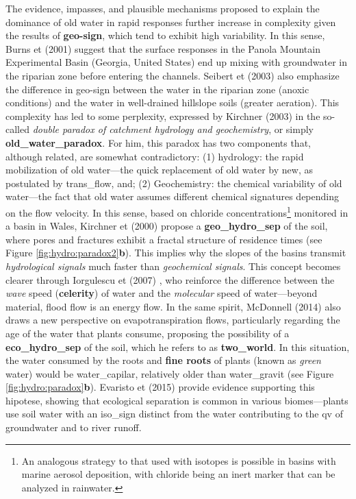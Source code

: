 \documentclass[./main_en.tex]{subfiles}
\begin{document}
\par The evidence, impasses, and plausible mechanisms proposed to explain the dominance of old water in rapid responses further increase in complexity given the results of \textbf{\gls{geo-sign}}, which tend to exhibit high variability. In this sense, Burns et  (2001) \cite{burns2001quantifying} suggest that the surface responses in the Panola Mountain Experimental Basin (Georgia, United States) end up mixing with groundwater in the riparian zone before entering the channels. Seibert et  (2003) \cite{seibert2003groundwater} also emphasize the difference in \gls{geo-sign} between the water in the riparian zone (anoxic conditions) and the water in well-drained hillslope soils (greater aeration). This complexity has led to some perplexity, expressed by Kirchner (2003) \cite{Kirchner2003} in the so-called \textit{double paradox of catchment hydrology and geochemistry}, or simply \textbf{\gls{old_water_paradox}}. For him, this paradox has two components that, although related, are somewhat contradictory: (1) \gls{hydrology}: the rapid mobilization of old water—the quick replacement of old water by new, as postulated by \gls{trans_flow}, and; (2) Geochemistry: the chemical variability of old water—the fact that old water assumes different chemical signatures depending on the flow velocity. In this sense, based on chloride concentrations\footnote{An analogous strategy to that used with isotopes is possible in basins with marine aerosol deposition, with chloride being an inert marker that can be analyzed in rainwater.} monitored in a basin in Wales, Kirchner et  (2000) \cite{kirchner2000} propose a \textbf{\gls{geo_hydro_sep}} of the soil, where pores and fractures exhibit a fractal structure of residence times (see Figure \ref{fig:hydro:paradox2}\textbf{b}). This implies why the slopes of the basins transmit \textit{hydrological signals} much faster than \textit{geochemical signals}. This concept becomes clearer through Iorgulescu et  (2007) \cite{Iorgulescu2007}, who reinforce the difference between the \textit{wave} speed (\textbf{celerity}) of water and the \textit{molecular} speed of water—beyond material, flood flow is an energy flow. In the same spirit, McDonnell (2014) \cite{mcdonnell2014} also draws a new perspective on evapotranspiration flows, particularly regarding the age of the water that plants consume, proposing the possibility of a \textbf{\gls{eco_hydro_sep}} of the soil, which he refers to as \textbf{\gls{two_world}}. In this situation, the water consumed by the roots and \textbf{fine roots} of plants (known as \textit{green} water) would be \gls{water_capilar}, relatively older than \gls{water_gravit} (see Figure \ref{fig:hydro:paradox}\textbf{b}). Evaristo et  (2015) \cite{Evaristo2015} provide evidence supporting this \gls{hipotese}, showing that ecological separation is common in various biomes—plants use soil water with an \gls{iso_sign} distinct from the water contributing to the \gls{qv} of groundwater and to river runoff.
\end{document}
